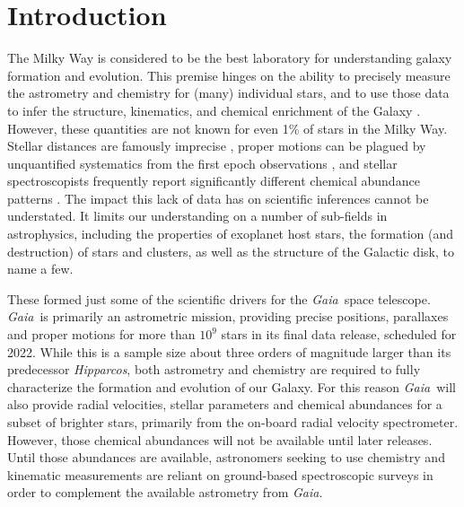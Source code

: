 \documentclass[preprint,trackchanges]{aastex}
\newcommand{\project}[1]{\textsl{#1}}
\newcommand{\gaia}{\project{Gaia}}
\newcommand{\hipparcos}{\project{Hipparcos}}
\begin{document}
\keywords{}

\section{Introduction} 
\label{sec:introduction}

The Milky Way is considered to be the best laboratory for understanding galaxy
formation and evolution.  This premise hinges on the ability to precisely measure 
the astrometry and chemistry for (many) individual stars, and to use those data 
to infer the structure, kinematics, and chemical enrichment of the Galaxy 
\citep[e.g.,][]{Schlaufman_2009,Deason_2011,Ness_2012,Ness_2013a,Ness_2013b,
Casey_2012,Casey_2013,Casey_2014a,Casey_2014b,Bovy_2016}.  However, these 
quantities are not known for even 1\% of stars in the Milky Way.  Stellar 
distances are famously imprecise \citep[e.g.,][]{van_Leeuwen_2007,Jofre_2015,
Madler_2016}, proper motions can be plagued by unquantified systematics from 
the first epoch observations \citep[e.g.,][]{Casey_Schlaufman_2015}, and 
stellar spectroscopists frequently report significantly different chemical 
abundance patterns \citep{Smiljanic_2014}.  The impact this lack of data has on
scientific inferences cannot be understated.  It limits our understanding on a
number of sub-fields in astrophysics, including the properties of exoplanet host
stars, the formation (and destruction) of stars and clusters, as well as the 
structure of the Galactic disk, to name a few.


These formed just some of the scientific drivers for the \gaia\ space telescope.
\gaia\ is primarily an astrometric mission, providing precise positions,
parallaxes and proper motions for more than $10^9$ stars in its final data
release, scheduled for 2022.  While this is a sample size about three orders 
of magnitude larger than its predecessor \hipparcos, both astrometry and 
chemistry are required to fully characterize the formation and evolution of our Galaxy.  
For this reason \gaia\ will also provide radial velocities, stellar parameters 
and chemical abundances for a subset of brighter stars, primarily from the on-board
radial velocity spectrometer.  However, those chemical abundances will not be 
available until later releases.  Until those abundances are available,
astronomers seeking to use chemistry and kinematic measurements are reliant on 
ground-based spectroscopic surveys in order to complement the available astrometry
from \gaia.
\end{document}
